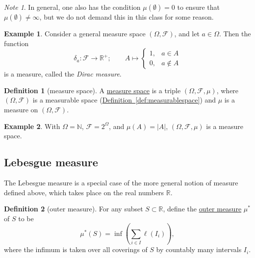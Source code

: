 \documentclass[a4paper,12pt]{scrreprt}
\newcommand{\R}{\mathbb{R}}
\newcommand{\N}{\mathbb{N}}
\newcommand{\defn}[1]{\ul{#1}}
\newcommand{\abs}[1]{\left|#1\right|}
\theoremstyle{definition}
\newtheorem{definition}{Definition}[section]
\newtheorem{example}{Example}[section]
\theoremstyle{plain}
\theoremstyle{remark}
\newtheorem{note}{Note}[section]
\begin{document}
\begin{note}
  In general, one also has the condition $\mu(\emptyset) = 0$ to ensure that $\mu( \emptyset ) \neq \infty$, but we do not demand this in this class for some reason.
\end{note}

\begin{example}
  \label{eg:diracmeasure}
  Consider a general measure space $(\Omega, \mathcal{F})$, and let $a \in \Omega$. Then the function
  \begin{equation*}
    \delta_{a}\colon \mathcal{F} \to \R^{+};\qquad A \mapsto
    \begin{cases}
      1, &a \in A \\
      0, &a \notin A
    \end{cases}
  \end{equation*}
  is a measure, called the \emph{Dirac measure}.
\end{example}

\begin{definition}[measure space]
  \label{def:measurespace}
  A \defn{measure space} is a triple $(\Omega, \mathcal{F}, \mu)$, where $(\Omega, \mathcal{F})$ is a measurable space (\hyperref[def:measurablespace]{Definition~\ref*{def:measurablespace}}) and $\mu$ is a measure on $(\Omega, \mathcal{F})$.
\end{definition}

\begin{example}
  \label{eg:discretemeasurespace}
  With $\Omega = \N$, $\mathcal{F} = 2^{\Omega}$, and $\mu(A) = \abs{A}$, $(\Omega, \mathcal{F}, \mu)$ is a measure space.
\end{example}

\subsection{Lebesgue measure}
The Lebesgue measure is a special case of the more general notion of measure defined above, which takes place on the real numbers $\R$.
\begin{definition}[outer measure]
  \label{def:outermeasure}
  For any subset $S \subset \R$, define the \defn{outer measure} $\mu^{*}$ of $S$ to be
  \begin{equation*}
    \mu^{*}(S) = \inf\left( \sum_{i \in I}\ell(I_{i}) \right),
  \end{equation*}
  where the infimum is taken over all coverings of $S$ by countably many intervals $I_{i}$.
\end{definition}
\end{document}
